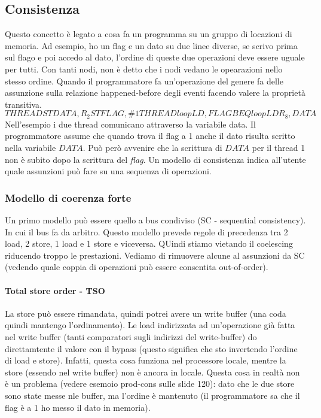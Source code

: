 \documentclass{article}
\begin{document}
\subsection{Consistenza}
Questo concetto è legato a cosa fa un programma su un gruppo di locazioni di memoria. Ad esempio, ho un flag e un dato su due linee diverse, se scrivo prima sul flago e poi accedo al dato, l'ordine di queste due operazioni deve essere uguale per tutti. Con tanti nodi, non è detto che i nodi vedano le opearazioni nello stesso ordine. Quando il programmatore fa un'operazione del genere fa delle assunzione sulla relazione happened-before degli eventi facendo valere la proprietà transitiva.
\begin{equation}
THREAD
    ST  DATA,R_2 
    ST  FLAG,\#1
THREAD
    loop LD,FLAG
    BEQ  loop 
    LD   R_8,DATA
\end{equation}
Nell'esempio i due thread comunicano attraverso la variabile data. Il programmatore assume che quando trova il flag a 1 anche il dato risulta scritto nella variabile $DATA$. Può però avvenire che la scrittura di $DATA$ per il thread 1 non è subito dopo la scrittura del \textit{flag}. Un modello di consistenza indica all'utente quale assunzioni può fare su una sequenza di operazioni.

\subsubsection{Modello di coerenza forte}
Un primo modello può essere quello a bus condiviso (SC - sequential consistency). In cui il bus fa da arbitro. Questo modello prevede regole di precedenza tra 2 load, 2 store, 1 load e 1 store e viceversa. QUindi stiamo vietando il coelescing riducendo troppo le prestazioni. Vediamo di rimuovere alcune al assunzioni da SC (vedendo quale coppia di operazioni può essere consentita out-of-order).

\paragraph{Total store order - TSO} La store può essere rimandata, quindi potrei avere un write buffer (una coda quindi mantengo l'ordinamento). Le load indirizzata ad un'operazione già fatta nel write buffer (tanti comparatori sugli indirizzi del write-buffer) do direttamtente il valore con il bypass (questo significa che sto invertendo l'ordine di load e store). Infatti, questa cosa funziona nel processore locale, mentre la store (essendo nel write buffer) non è ancora in locale. Questa cosa in realtà non è un problema (vedere esemoio prod-cons sulle slide 120): dato che le due store sono state messe nle buffer, ma l'ordine è mantenuto (il programmatore sa che il flag è a 1 ho messo il dato in memoria).
\end{document}
